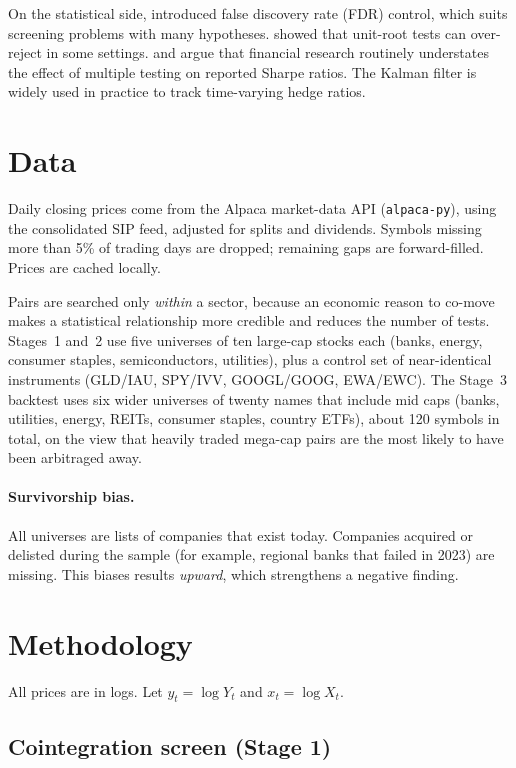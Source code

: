 \documentclass[11pt]{article}
\newcommand{\code}[1]{\texttt{#1}}
\begin{document}
On the statistical side, \citet{benjamini1995} introduced false discovery rate (FDR) control,
which suits screening problems with many hypotheses. \citet{schwert1989} showed that unit-root
tests can over-reject in some settings. \citet{harvey2016} and \citet{bailey2014} argue that
financial research routinely understates the effect of multiple testing on reported Sharpe
ratios. The Kalman filter \citep{kalman1960} is widely used in practice to track time-varying
hedge ratios.

\section{Data}

Daily closing prices come from the Alpaca market-data API (\code{alpaca-py}), using the
consolidated SIP feed, adjusted for splits and dividends. Symbols missing more than 5\% of
trading days are dropped; remaining gaps are forward-filled. Prices are cached locally.

Pairs are searched only \emph{within} a sector, because an economic reason to co-move makes
a statistical relationship more credible and reduces the number of tests. Stages~1 and~2 use
five universes of ten large-cap stocks each (banks, energy, consumer staples, semiconductors,
utilities), plus a control set of near-identical instruments (GLD/IAU, SPY/IVV, GOOGL/GOOG,
EWA/EWC). The Stage~3 backtest uses six wider universes of twenty names that include mid caps
(banks, utilities, energy, REITs, consumer staples, country ETFs), about 120 symbols in total,
on the view that heavily traded mega-cap pairs are the most likely to have been arbitraged away.

\paragraph{Survivorship bias.} All universes are lists of companies that exist today.
Companies acquired or delisted during the sample (for example, regional banks that failed in
2023) are missing. This biases results \emph{upward}, which strengthens a negative finding.

\section{Methodology}

All prices are in logs. Let $y_t=\log Y_t$ and $x_t=\log X_t$.

\subsection{Cointegration screen (Stage 1)}
\end{document}
